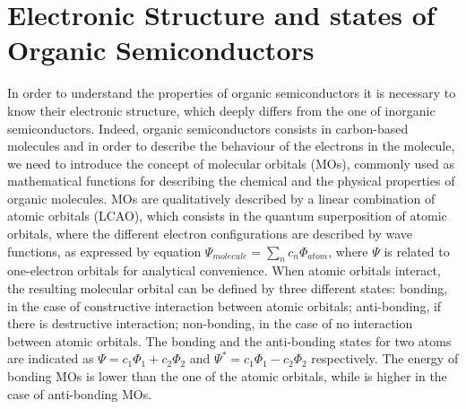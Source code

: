 \documentclass  [
  paper    = a4,
  BCOR     = 10mm,
  twoside,
  fontsize = 12pt,
  fleqn,
  toc      = bibnumbered,
  toc      = listofnumbered,
  numbers  = noendperiod,
  headings = normal,
  listof   = leveldown,
  version  = 3.03
]                                       {scrreprt}
\begin{document}
	\section{Electronic Structure and states of Organic Semiconductors}\label{sec:electronic}


In order to understand the properties of organic semiconductors it is necessary to know their electronic structure, which deeply differs from the one of inorganic semiconductors. Indeed, organic semiconductors consists in carbon-based molecules and in order to describe the behaviour of the electrons in the molecule, we need to introduce the concept of molecular orbitals (MOs), commonly used as mathematical functions for describing the chemical and the physical properties of organic molecules. MOs are qualitatively described by a linear combination of atomic orbitals (LCAO), which consists in the quantum superposition of atomic orbitals, where the different electron configurations are described by wave functions, as expressed by equation $\Psi_{molecule} = \sum_{n} c_n \Phi_{atom}$, where $\Psi$ is related to one-electron orbitals for analytical convenience. When atomic orbitals interact, the resulting molecular orbital can be defined by three different states: bonding, in the case of constructive interaction between atomic orbitals; anti-bonding, if there is destructive interaction; non-bonding, in the case of no interaction between atomic orbitals. The bonding and the anti-bonding states for two atoms are indicated as $\Psi=c_1\Phi_1+c_2\Phi_2$ and $\Psi^*=c_1\Phi_1-c_2\Phi_2$ respectively. The energy of bonding MOs is lower than the one of the atomic orbitals, while is higher in the case of anti-bonding MOs.\\
\end{document}
